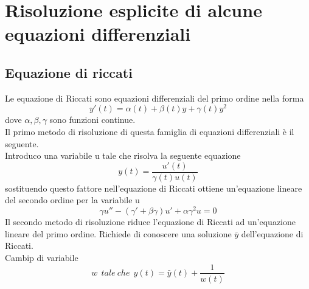 \documentclass{article}
\theoremstyle{definition}
\begin{document}
 	 	 	\section{Risoluzione esplicite di alcune equazioni differenziali}
 	 	 	\subsection{Equazione di riccati}
 	 	 	Le equazione di Riccati sono equazioni differenziali del primo ordine nella forma 
 	 	 	$$y'(t)=\alpha(t)+\beta(t)y+\gamma(t)y^2$$
 	 	 	dove $\alpha , \beta , \gamma $ sono funzioni continue. \\
 	 	 	Il primo  metodo di risoluzione di questa famiglia di equazioni differenziali è il seguente. \\
 	 	 	Introduco una variabile u tale che risolva la seguente equazione 
 	 	 	$$y(t)=\frac{u'(t)}{\gamma(t)u(t)}$$
 	 	 	sostituendo questo fattore nell'equazione di Riccati ottiene un'equazione lineare del secondo ordine per la variabile u 
 	 	 	$$\gamma u'' - (\gamma'+\beta \gamma )u'+\alpha \gamma^2 u=0$$
 	 	 	Il secondo metodo di risoluzione riduce l'equazione di Riccati ad un'equazione lineare del primo ordine. Richiede di conoscere una soluzione $\bar{y}$ dell'equazione di Riccati. \\
 	 	 	Cambip di variabile 
 	 	 	$$w \ \ tale \ che \ \  y(t)=\bar{y}(t)+\frac{1}{w(t)}$$
\end{document}
